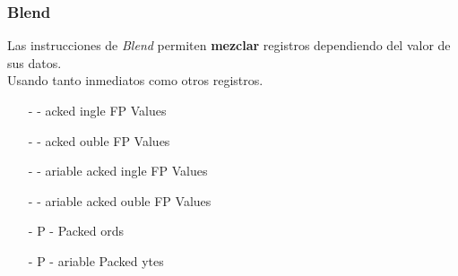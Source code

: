 \documentclass[aspectratio=169]{beamer}
\begin{document}
\begin{frame}[fragile,t]
	\frametitle{Blend}
	Las instrucciones de \emph{Blend} permiten \textbf{mezclar} registros dependiendo del valor de sus datos.\\
	Usando tanto inmediatos como otros registros.
	\vskip 10pt
	\pause
	\begin{itemize}
	 \item[-] {\color{a}{BLEND}}{\color{r}{P}}{\color{v}{S}}  - {\color{a}{Blend}} {\color{r}{P}}acked {\color{v}{S}}ingle FP Values
	 \item[-] {\color{a}{BLEND}}{\color{r}{P}}{\color{v}{D}}  - {\color{a}{Blend}} {\color{r}{P}}acked {\color{v}{D}}ouble FP Values
	\end{itemize}
	\begin{itemize}
	 \item[-] {\color{a}{BLEND}}{\color{orange}{V}}{\color{r}{P}}{\color{v}{S}} - {\color{orange}{V}}ariable {\color{a}{Blend}} {\color{r}{P}}acked {\color{v}{S}}ingle FP Values
	 \item[-] {\color{a}{BLEND}}{\color{orange}{V}}{\color{r}{P}}{\color{v}{D}} - {\color{orange}{V}}ariable {\color{a}{Blend}} {\color{r}{P}}acked {\color{v}{D}}ouble FP Values
	\end{itemize}
	\begin{itemize}
	 \item[-] P{\color{a}{BLEND}}{\color{v}{W}}  - {\color{a}{Blend}} Packed {\color{v}{W}}ords
	\end{itemize}
	\begin{itemize}
	 \item[-] P{\color{a}{BLEND}}{\color{orange}{V}}{\color{v}{B}} - {\color{orange}{V}}ariable {\color{a}{Blend}} Packed {\color{v}{B}}ytes
	\end{itemize}
\end{frame}
\end{document}
